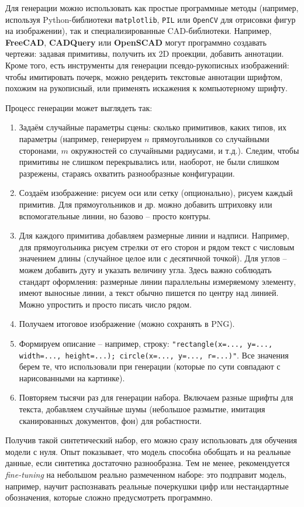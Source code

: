 \documentclass{article}
\begin{document}
Для генерации можно использовать как простые программные методы (например, используя Python-библиотеки \texttt{matplotlib}, \texttt{PIL} или \texttt{OpenCV} для отрисовки фигур на изображении), так и специализированные CAD-библиотеки. Например, \textbf{FreeCAD}, \textbf{CADQuery} или \textbf{OpenSCAD} могут программно создавать чертежи: задавая примитивы, получить их 2D проекции, добавить аннотации. Кроме того, есть инструменты для генерации псевдо-рукописных изображений: чтобы имитировать почерк, можно рендерить текстовые аннотации шрифтом, похожим на рукописный, или применять искажения к компьютерному шрифту.

Процесс генерации может выглядеть так:
\begin{enumerate}
\item Задаём случайные параметры сцены: сколько примитивов, каких типов, их параметры (например, генерируем $n$ прямоугольников со случайными сторонами, $m$ окружностей со случайными радиусами, и т.д.). Следим, чтобы примитивы не слишком перекрывались или, наоборот, не были слишком разрежены, стараясь охватить разнообразные конфигурации.
\item Создаём изображение: рисуем оси или сетку (опционально), рисуем каждый примитив. Для прямоугольников и др. можно добавить штриховку или вспомогательные линии, но базово – просто контуры.
\item Для каждого примитива добавляем размерные линии и надписи. Например, для прямоугольника рисуем стрелки от его сторон и рядом текст с числовым значением длины (случайное целое или с десятичной точкой). Для углов – можем добавить дугу и указать величину угла. Здесь важно соблюдать стандарт оформления: размерные линии параллельны измеряемому элементу, имеют выносные линии, а текст обычно пишется по центру над линией. Можно упростить и просто писать число рядом.
\item Получаем итоговое изображение (можно сохранять в PNG).
\item Формируем описание – например, строку: \texttt{"rectangle(x=..., y=..., width=..., height=...); circle(x=..., y=..., r=...)"}. Все значения берем те, что использовали при генерации (которые по сути совпадают с нарисованными на картинке).
\item Повторяем тысячи раз для генерации набора. Включаем разные шрифты для текста, добавляем случайные шумы (небольшое размытие, имитация сканированных документов, фон) для робастности.
\end{enumerate}

Получив такой синтетический набор, его можно сразу использовать для обучения модели с нуля. Опыт показывает, что модель способна обобщать и на реальные данные, если синтетика достаточно разнообразна. Тем не менее, рекомендуется \textit{fine-tuning} на небольшом реально размеченном наборе: это подправит модель, например, научит распознавать реальные почеркушки цифр или нестандартные обозначения, которые сложно предусмотреть программно.
\end{document}

